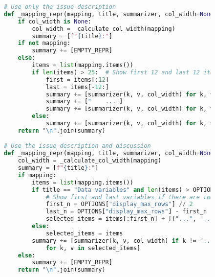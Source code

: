 \begin{figure}[ht]
\begin{minipage}{\textwidth}
\begin{lstlisting}[caption={SWE-Agent improves when incorporating issue discussions},label={lst:swe-agent-with-discussion}, captionpos=t, breaklines=true, language=Python]
# Use only the issue description
def _mapping_repr(mapping, title, summarizer, col_width=None):
    if col_width is None:
        col_width = _calculate_col_width(mapping)
        summary = [f"{title}:"]
    if not mapping:
        summary += [EMPTY_REPR]
    else:
        items = list(mapping.items())
        if len(items) > 25:  # Show first 12 and last 12 items
            first = items[:12]
            last = items[-12:]
            summary += [summarizer(k, v, col_width) for k, v in first]
            summary += ["    ..."]
            summary += [summarizer(k, v, col_width) for k, v in last]
        else:
            summary += [summarizer(k, v, col_width) for k, v in items]
    return "\n".join(summary)

# Use the issue description and discussion
def _mapping_repr(mapping, title, summarizer, col_width=None):
    col_width = _calculate_col_width(mapping)
    summary = [f"{title}:"]
    if mapping:
        items = list(mapping.items())
        if title == "Data variables" and len(items) > OPTIONS["display_max_rows"]:
            # Show first and last variables if there are too many
            first_n = OPTIONS["display_max_rows"] // 2
            last_n = OPTIONS["display_max_rows"] - first_n
            selected_items = items[:first_n] + [("...", "...")] + items[-last_n:]
        else:
            selected_items = items
        summary += [summarizer(k, v, col_width) if k != "..." else "    ..."
            for k, v in selected_items]
    else:
        summary += [EMPTY_REPR]
    return "\n".join(summary)
\end{lstlisting}
\end{minipage}
\end{figure}




